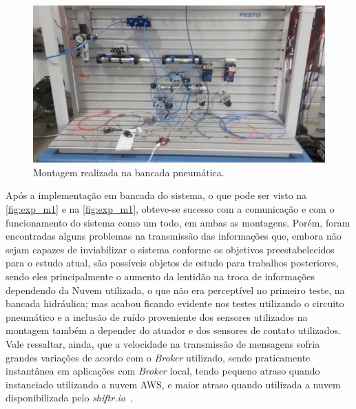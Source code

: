 \begin{figure}[htb]
    \begin{center}
	    \includegraphics[scale=0.5]{figs/exp_p.png}
	\end{center}
	\caption{\label{fig:exp_m2} Montagem realizada na bancada pneumática.} 
\end{figure}


Após a implementação em bancada do sistema, o que pode ser visto na \autoref{fig:exp_m1} e na \autoref{fig:exp_m1},
obteve-se sucesso com a comunicação e com o funcionamento do sistema como um todo,
em ambas as montagens. Porém, foram encontradas alguns problemas na transmissão das informações que, embora não sejam
capazes de inviabilizar o sistema conforme os objetivos preestabelecidos para o estudo atual, são possíveis objetos de 
estudo para trabalhos posteriores, sendo eles principalmente o aumento da lentidão na troca de informações dependendo da 
Nuvem utilizada, o que não era perceptível no primeiro teste, na bancada hidráulica; mas acabou ficando evidente nos testes
utilizando o circuito pneumático e a inclusão de ruído proveniente dos sensores utilizados na montagem
também a depender do atuador e dos sensores de contato utilizados. Vale ressaltar, ainda, que a velocidade na transmissão
de mensagens sofria grandes variações de acordo com o \textit{Broker} utilizado, sendo praticamente instantânea em aplicações com
\textit{Broker} local, tendo pequeno atraso quando instanciado utilizando a nuvem AWS, e maior atraso quando utilizada a
nuvem disponibilizada pelo \textit{shiftr.io}~\textregistered.